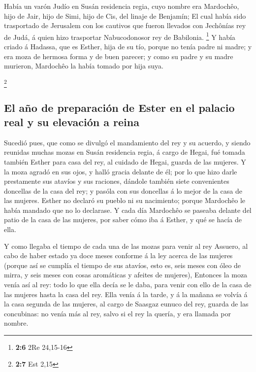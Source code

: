  Había un varón Judío en Susán residencia regia, cuyo
nombre era Mardochêo, hijo de Jair, hijo de Simi, hijo de Cis, del
linaje de Benjamín;  El cual había sido trasportado de
Jerusalem con los cautivos que fueron llevados con Jechônías rey de
Judá, á quien hizo trasportar Nabucodonosor rey de Babilonia.
\footnote{\textbf{2:6} 2Re 24,15-16}  Y había criado á
Hadassa, que es Esther, hija de su tío, porque no tenía padre ni madre;
y era moza de hermosa forma y de buen parecer; y como su padre y su
madre murieron, Mardochêo la había tomado por hija suya.

\footnote{\textbf{2:7} Est 2,15}

\hypertarget{el-auxf1o-de-preparaciuxf3n-de-ester-en-el-palacio-real-y-su-elevaciuxf3n-a-reina}{%
\subsection{El año de preparación de Ester en el palacio real y su
elevación a
reina}\label{el-auxf1o-de-preparaciuxf3n-de-ester-en-el-palacio-real-y-su-elevaciuxf3n-a-reina}}

 Sucedió pues, que como se divulgó el mandamiento del rey
y su acuerdo, y siendo reunidas muchas mozas en Susán residencia regia,
á cargo de Hegai, fué tomada también Esther para casa del rey, al
cuidado de Hegai, guarda de las mujeres.  Y la moza agradó
en sus ojos, y halló gracia delante de él; por lo que hizo darle
prestamente sus atavíos y sus raciones, dándole también siete
convenientes doncellas de la casa del rey; y pasóla con sus doncellas á
lo mejor de la casa de las mujeres.  Esther no declaró su
pueblo ni su nacimiento; porque Mardochêo le había mandado que no lo
declarase.  Y cada día Mardochêo se paseaba delante del
patio de la casa de las mujeres, por saber cómo iba á Esther, y qué se
hacía de ella.

 Y como llegaba el tiempo de cada una de las mozas para
venir al rey Assuero, al cabo de haber estado ya doce meses conforme á
la ley acerca de las mujeres (porque así se cumplía el tiempo de sus
atavíos, esto es, seis meses con óleo de mirra, y seis meses con cosas
aromáticas y afeites de mujeres),  Entonces la moza venía
así al rey: todo lo que ella decía se le daba, para venir con ello de la
casa de las mujeres hasta la casa del rey.  Ella venía á
la tarde, y á la mañana se volvía á la casa segunda de las mujeres, al
cargo de Saasgaz eunuco del rey, guarda de las concubinas: no venía más
al rey, salvo si el rey la quería, y era llamada por nombre.

